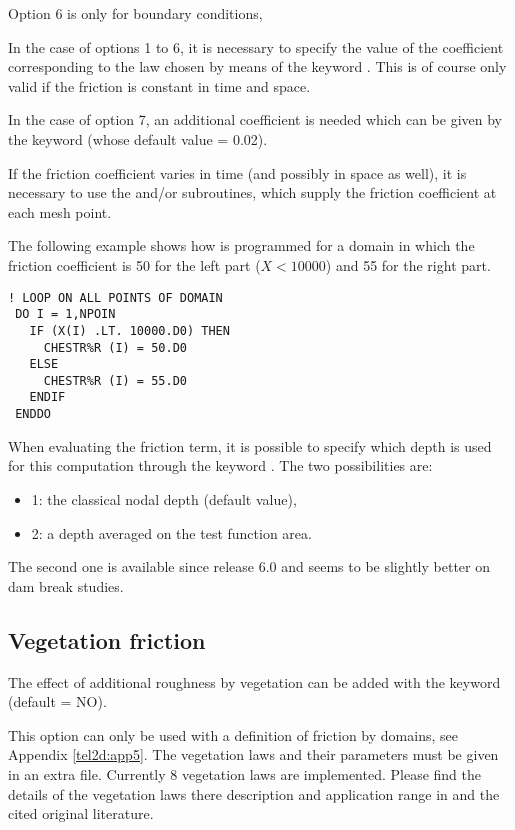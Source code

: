 Option 6 is only for boundary conditions,

In the case of options 1 to 6, it is necessary to specify the value
of the coefficient corresponding to the law chosen by means of the keyword
.
This is of course only valid if the friction is constant in time and space.

In the case of option 7, an additional coefficient is needed which can be given
by the keyword
(whose default value = 0.02).

If the friction coefficient varies in time (and possibly in space as well),
it is necessary to use the  and/or 
subroutines, which supply the friction coefficient at each mesh point.

The following example shows how  is programmed for a
domain in which the friction coefficient is 50 for the left part ($X<10000$)
and 55 for the right part.
\begin{lstlisting}[language=TelFortran]
! LOOP ON ALL POINTS OF DOMAIN
 DO I = 1,NPOIN
   IF (X(I) .LT. 10000.D0) THEN
     CHESTR%R (I) = 50.D0
   ELSE
     CHESTR%R (I) = 55.D0
   ENDIF
 ENDDO
\end{lstlisting}
When evaluating the friction term, it is possible to specify which depth is used
for this computation through the keyword .
The two possibilities are:
\begin{itemize}
\item 1: the classical nodal depth (default value),
\item 2: a depth averaged on the test function area.
\end{itemize}
The second one is available since release 6.0 and seems to be slightly better
on dam break studies.


\subsection{Vegetation friction}

The effect of additional roughness by vegetation can be added 
with the keyword  (default = NO).

This option can only be used with a definition of friction by domains,
see Appendix \ref{tel2d:app5}. The vegetation laws and their parameters
must be given in an extra file. Currently 8 vegetation laws are implemented. 
Please find the details of the vegetation laws there description and application range in 
\cite{folke2019vegetation} and the cited original literature. 

